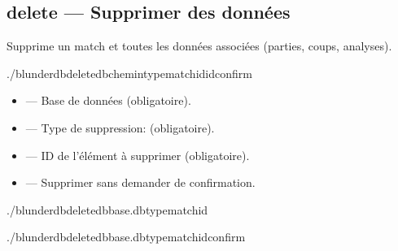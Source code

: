 \documentclass[letterpaper,10pt,french]{sphinxmanual}
\begin{document}
\subsection{delete — Supprimer des données}
\label{\detokenize{cli:delete-supprimer-des-donnees}}
\sphinxAtStartPar
Supprime un match et toutes les données associées (parties, coups, analyses).

\begin{sphinxVerbatim}[commandchars=\\\{\}]
./blunderdbdelete\PYGZhy{}\PYGZhy{}db\PYGZlt{}chemin\PYGZgt{}\PYGZhy{}\PYGZhy{}typematch\PYGZhy{}\PYGZhy{}id\PYGZlt{}id\PYGZgt{}\PYG{o}{[}\PYGZhy{}\PYGZhy{}confirm\PYG{o}{]}
\end{sphinxVerbatim}

\sphinxAtStartPar
{}
\begin{itemize}
\item {} 
\sphinxAtStartPar
{} — Base de données (obligatoire).

\item {} 
\sphinxAtStartPar
{} — Type de suppression:  (obligatoire).

\item {} 
\sphinxAtStartPar
{} — ID de l’élément à supprimer (obligatoire).

\item {} 
\sphinxAtStartPar
{} — Supprimer sans demander de confirmation.

\end{itemize}

\sphinxAtStartPar
{}

\begin{sphinxVerbatim}[commandchars=\\\{\}]
./blunderdbdelete\PYGZhy{}\PYGZhy{}dbbase.db\PYGZhy{}\PYGZhy{}typematch\PYGZhy{}\PYGZhy{}id

./blunderdbdelete\PYGZhy{}\PYGZhy{}dbbase.db\PYGZhy{}\PYGZhy{}typematch\PYGZhy{}\PYGZhy{}id\PYGZhy{}\PYGZhy{}confirm
\end{sphinxVerbatim}
\end{document}
